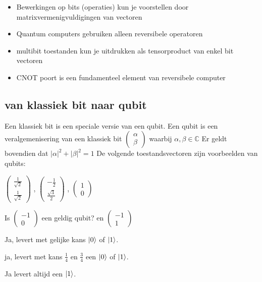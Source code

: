 \documentclass[../../main.tex]{subfiles}
\begin{document}
\begin{itemize}[noitemsep]
\item Bewerkingen op bits (operaties) kun je voorstellen door matrixvermenigvuldigingen van vectoren
\item Quantum computers gebruiken alleen reversibele operatoren
\item multibit toestanden kun je uitdrukken als tensorproduct van enkel bit vectoren
\item CNOT poort is een fundamenteel element van reversibele computer
\end{itemize}
 
\subsection{van klassiek bit naar qubit}
Een klassiek bit is een speciale versie van een qubit. Een qubit is een veralgemenisering van een klassiek bit
$\begin{pmatrix}
\alpha\\
\beta
\end{pmatrix}
$ waarbij $\alpha, \beta\in \mathbb{C}$
Er geldt bovendien dat
${|\alpha|}^2 +{|\beta|}^2 = 1$
De volgende toestandsvectoren zijn voorbeelden van qubits:

$\begin{pmatrix}
\tfrac{1}{\sqrt{2}}\\
\tfrac{1}{\sqrt{2}}
\end{pmatrix}
$
, $\begin{pmatrix}
-\tfrac{1}{2}\\
\tfrac{\sqrt{3}}{2}
\end{pmatrix}
$
, $\begin{pmatrix}
1\\
0
\end{pmatrix}
$

Is $\begin{pmatrix}
-1\\
0
\end{pmatrix}
$
een geldig qubit? en $\begin{pmatrix}
-1\\
1
\end{pmatrix}
$

Ja, levert met gelijke kans $\ket{0}$ of $\ket{1}$.

ja, levert met kans $\tfrac{1}{4}$ en $\tfrac{3}{4}$ een $\ket{0}$ of $\ket{1}$.

Ja levert altijd een  $\ket{1}$.
\end{document}
